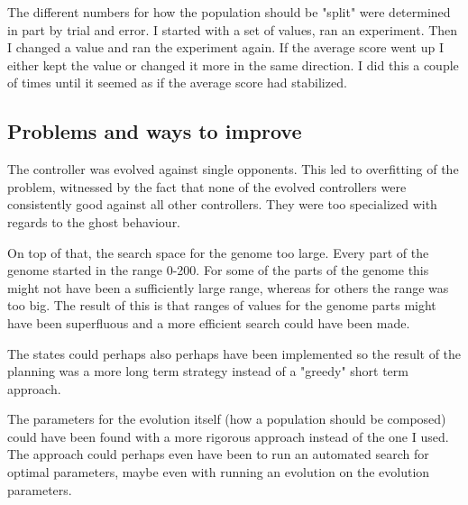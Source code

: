 The different numbers for how the population should be "split" were determined in part by trial and error. I started with a set of values, ran an experiment. Then I changed a value and ran the experiment again. If the average score went up I either kept the value or changed it more in the same direction. I did this a couple of times until it seemed as if the average score had stabilized.


\subsection*{Problems and ways to improve}

The controller was evolved against single opponents. This led to overfitting of the problem, witnessed by the fact that none of the evolved controllers were consistently good against all other controllers. They were too specialized with regards to the ghost behaviour.

On top of that, the search space for the genome too large. Every part of the genome started in the range 0-200. For some of the
parts of the genome this might not have been a sufficiently large range, whereas for others the range was too big. The result of this is that ranges of values for the genome parts might have been superfluous and a more efficient search could have been made.

The states could perhaps also perhaps have been implemented so the result of the planning was a more long term strategy instead of a "greedy" short term approach.

The parameters for the evolution itself (how a population should be composed) could have been found with a more rigorous approach instead of the one I used. The approach could perhaps even have been to run an automated search for optimal parameters, maybe even with running an evolution on the evolution parameters.